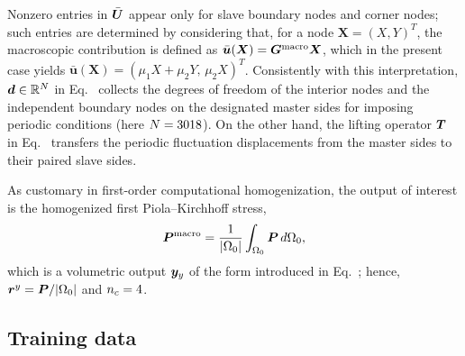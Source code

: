 \documentclass[preprint,10pt]{elsarticle}  %
\begin{document}
Nonzero entries in $\bar{\bm{U}}$ appear only for slave boundary nodes   and   corner
nodes; such entries are determined by considering that,  for a node $\bm{X}=(X,Y)^T$, the   macroscopic contribution is defined   as $\bar{\bm{u}}(\bm{X})=\bm{G}^{\mathrm{macro}} \bm{X}$, which in the present
case yields $\bar{\bm{u}}(\bm{X})=( \mu_1 X+ \mu_2 Y,\,
\mu_2 X)^T$.  Consistently with this interpretation, \(\bm{d} \in \mathbb{R}^{N}\)  in
Eq.~ collects the degrees of freedom of
the interior nodes and the independent boundary nodes on the
designated master sides for imposing periodic conditions (here $N = 3018$). On the other hand, the lifting operator \(\bm{T}\) in Eq.~ transfers the
periodic fluctuation displacements from the master sides to their
paired slave sides.


As customary in first-order computational homogenization, the output of
interest is the homogenized first Piola--Kirchhoff stress,
\begin{equation}
\label{eq:meta_homogenized_stress}
    \bm{P}^{\mathrm{macro}}
    =
    \frac{1}{|\Omega_0|}
    \int_{\Omega_0}\boldsymbol{P}\,d\Omega_0,
\end{equation}
which is a volumetric output \(\bm{y}_{{y}}\) of the form introduced in
Eq.~; hence,  $\bm{r}^{{y}} = \boldsymbol{P}/|\Omega_0| $ and  \(n_c=4\).




\subsection{Training data}
\end{document}
